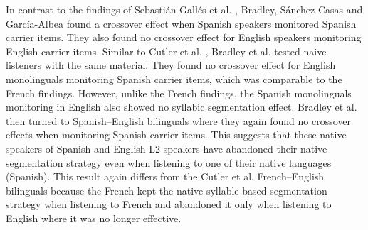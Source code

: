 In contrast to the findings of Sebastián-Gallés et al. \parencite*{Sebastian-Galles1992-xd} , Bradley, Sánchez-Casas and García-Albea \parencite*{Bradley1993-qq}  found a crossover effect when Spanish speakers monitored Spanish carrier items. They also found no crossover effect for English speakers monitoring English carrier items. Similar to Cutler et al. \parencite*{Cutler1986-zl}, Bradley et al. \parencite*{Bradley1993-qq}  tested naive listeners with the same material. They found no crossover effect for English monolinguals monitoring Spanish carrier items, which was comparable to the French findings. However, unlike the French findings, the Spanish monolinguals monitoring in English also showed no syllabic segmentation effect. Bradley et al. \parencite*{Bradley1993-qq} then turned to Spanish–English bilinguals where they again found no crossover effects when monitoring Spanish carrier items. This suggests that these native speakers of Spanish and English L2 speakers have abandoned their native segmentation strategy even when listening to one of their native languages (Spanish). This result again differs from the Cutler et al. \parencite*{Cutler1986-zl} French–English bilinguals because the French kept the native syllable-based segmentation strategy when listening to French and abandoned it only when listening to English where it was no longer effective.




